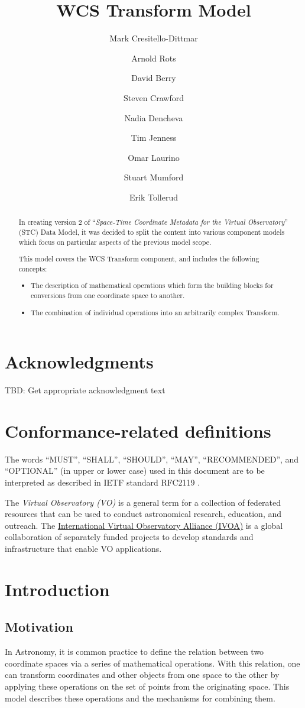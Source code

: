 \documentclass[11pt,a4paper]{ivoa}
\title{WCS Transform Model}
\author{Mark Cresitello-Dittmar}
\author{Arnold Rots}
\author{David Berry}
\author{Steven Crawford}
\author{Nadia Dencheva}
\author{Tim Jenness}
\author{Omar Laurino}
\author{Stuart Mumford}
\author{Erik Tollerud}
\begin{document}
\begin{abstract}
  In creating version 2 of ``\emph{Space-Time Coordinate Metadata for the Virtual Observatory}'' (STC) \citep{std:STC} Data Model, it was decided to split the content into various component models which focus on particular aspects of the previous model scope.  
  
  This model covers the WCS Transform component, and includes the following concepts:
  \begin{itemize}
  \item The description of mathematical operations which form the building blocks for conversions from one coordinate space to another.
  \item The combination of individual operations into an arbitrarily complex Transform.
  \end{itemize}
\end{abstract}

\section*{Acknowledgments}
TBD: Get appropriate acknowledgment text

\section*{Conformance-related definitions}

The words ``MUST'', ``SHALL'', ``SHOULD'', ``MAY'', ``RECOMMENDED'', and
``OPTIONAL'' (in upper or lower case) used in this document are to be
interpreted as described in IETF standard RFC2119 \citep{std:RFC2119}.

The \emph{Virtual Observatory (VO)} is a
general term for a collection of federated resources that can be used
to conduct astronomical research, education, and outreach.
The \href{http://www.ivoa.net}{International
Virtual Observatory Alliance (IVOA)} is a global
collaboration of separately funded projects to develop standards and
infrastructure that enable VO applications.

\section{Introduction}

\subsection{Motivation}
In Astronomy, it is common practice to define the relation between two coordinate spaces via a series of mathematical operations.  
With this relation, one can transform coordinates and other objects from one space to the other by applying these operations on
the set of points from the originating space.  This model describes these operations and the mechanisms for combining them.
\end{document}
